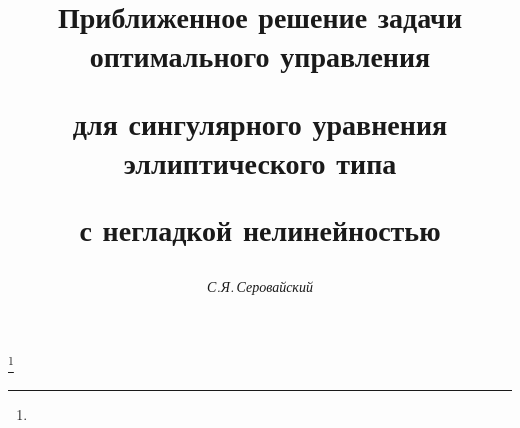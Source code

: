 

 


% 


\newcommand{\tts}[1]{}  


 


 




\setcounter{page}{80} 














 


\author{\it С.Я.\,Серовайский} 




\title{Приближенное решение задачи оптимального управления 


для сингулярного уравнения эллиптического типа 


с негладкой нелинейностью} 


\thanks{} 


 


\date{} 




\pagestyle{plain} %


 




\maketitle 


